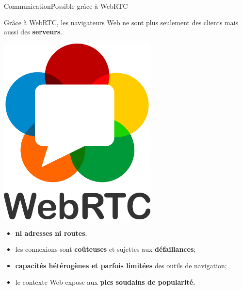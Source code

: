 \begin{frame}{Communication}{Possible grâce à WebRTC}


  \begin{minipage}{0.67\textwidth}
    Grâce à WebRTC, les navigateurs Web ne sont plus seulement des clients mais
    aussi des \textbf{serveurs}.
  \end{minipage}
  \hfill
  \begin{minipage}{0.3\textwidth}
    \begin{center}
    \includegraphics[width=0.6\textwidth]{img/webrtc.png}
    \end{center}
  \end{minipage}
  
  \begin{itemize}
  \item \textbf{ni adresses ni routes};
  \item les connexions sont \textbf{coûteuses} et sujettes aux
    \textbf{défaillances};
  \item \textbf{capacités hétérogènes et parfois limitées} des outils de
    navigation;
  \item le contexte Web expose aux \textbf{pics soudains de popularité.}
  \end{itemize}
  
  \vspace{0.5cm}


\end{frame}
